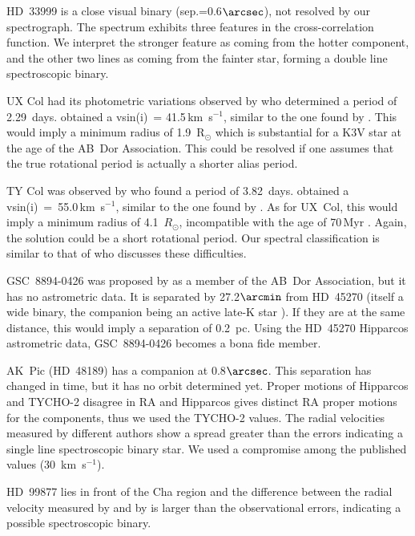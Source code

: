\documentclass[11pt,twoside]{book}
\begin{document}
HD~33999 is a close visual binary (sep.=0.6$\arcsec$), not resolved by our spectrograph.  The spectrum exhibits three features in the
cross-correlation function.  We interpret the stronger feature as
coming from the hotter component, and the other two lines
as coming from the fainter star, forming a double line spectroscopic
binary.

UX Col had its photometric variations observed by \citet{cutispoto03}
who determined a period of 2.29~days.  \citet{torres06} obtained a
vsin(i)~= 41.5\,km~s$^{-1}$, similar to the one found by
\citet{tagliaferri94}.  This would imply a minimum radius of
1.9~R$_\odot$ which is substantial for a K3V star at the age of the
AB~Dor Association. This could be resolved if one assumes
that the true rotational period is actually a shorter alias period.

TY Col was observed by \citet{cutispoto01} who
found a period of 3.82~days.  \citet{torres06} obtained a
vsin(i)~=~55.0\,km~s$^{-1}$, similar to the one found by
\citet{tagliaferri94}.  As for UX~Col, this would imply a minimum
radius of 4.1~$R_{\odot}$, incompatible with the age of 70\,Myr .
Again, the solution could be a short rotational period.  Our spectral
classification is similar to that of \citet{cutispoto98} who discusses
these difficulties.

GSC~8894-0426 was proposed by \citet{zuckerman04} as a member of the
AB~Dor Association, but it has no astrometric data.  It is separated
by 27.2$\arcmin$ from HD~45270 (itself a wide binary, the companion
being an active late-K star \citep{cutispoto02}).  If they are at the
same distance, this would imply a separation of 0.2~pc.  Using the
HD~45270 Hipparcos astrometric data, GSC~8894-0426 becomes a bona fide
member.

AK~Pic (HD~48189) has a companion at 0.8$\arcsec$.
This separation has changed in time, but it has no orbit determined yet.
Proper motions of Hipparcos and TYCHO-2 disagree in RA and
Hipparcos gives distinct RA proper motions for the components, thus we used the TYCHO-2 values.
The radial velocities measured by different authors show a spread greater than the errors
indicating a single line spectroscopic binary star.
We used a compromise among the published values (30~km~s$^{-1}$).

HD~99877 lies in front of the Cha region and the difference between
the radial velocity measured by \citet{covino97} and by \citet{nord04}
is larger than the observational errors, indicating a possible spectroscopic
binary.
\end{document}
